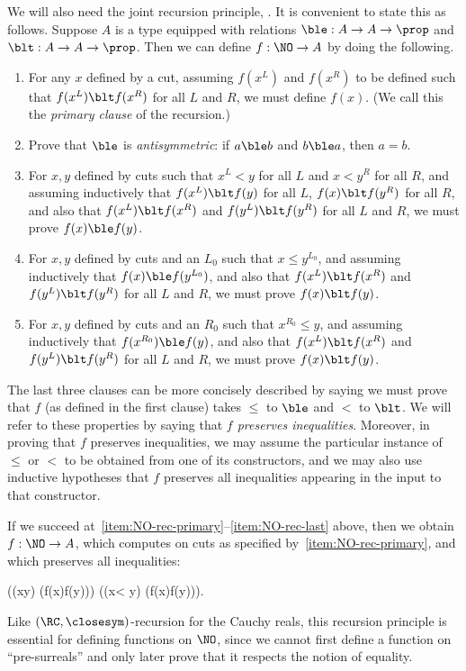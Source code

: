 We will also need the joint recursion principle, .
It is convenient to state this as follows.
Suppose $A$ is a type equipped with relations $\mathord\ble:A\to A\to\prop$ and $\mathord\blt:A\to A\to\prop$.
Then we can define $f:\NO\to A$ by doing the following.
\begin{enumerate}
\item For any $x$ defined by a cut, assuming $f(x^L)$ and $f(x^R)$ to be defined such that $f(x^L)\blt f(x^R)$ for all $L$ and $R$, we must define $f(x)$.  (We call this the \emph{primary clause} of the recursion.)\label{item:NO-rec-primary}
\item Prove that $\ble$ is \emph{antisymmetric}: if $a\ble b$ and $b\ble a$, then $a=b$.
\item For $x,y$ defined by cuts such that $x^L<y$ for all $L$ and $x<y^R$ for all $R$, and assuming inductively that $f(x^L)\blt f(y)$ for all $L$, $f(x)\blt f(y^R)$ for all $R$, and also that $f(x^L)\blt f(x^R)$ and $f(y^L)\blt f(y^R)$ for all $L$ and $R$, we must prove $f(x)\ble f(y)$.
\item For $x,y$ defined by cuts and an $L_0$ such that $x\le y^{L_0}$, and assuming inductively that $f(x)\ble f(y^{L_0})$, and also that $f(x^L)\blt f(x^R)$ and $f(y^L)\blt f(y^R)$ for all $L$ and $R$, we must prove $f(x)\blt f(y)$.
\item For $x,y$ defined by cuts and an $R_0$ such that $x^{R_0}\le y$, and assuming inductively that $f(x^{R_0})\ble f(y)$, and also that $f(x^L)\blt f(x^R)$ and $f(y^L)\blt f(y^R)$ for all $L$ and $R$, we must prove $f(x)\blt f(y)$.\label{item:NO-rec-last}
\end{enumerate}
The last three clauses can be more concisely described by saying we must prove that $f$ (as defined in the first clause) takes $\le$ to $\ble$ and $<$ to $\blt$.
We will refer to these properties by saying that \emph{$f$ preserves inequalities}.
Moreover, in proving that $f$ preserves inequalities, we may assume the particular instance of $\le$ or $<$ to be obtained from one of its constructors, and we may also use inductive hypotheses that $f$ preserves all inequalities appearing in the input to that constructor.

If we succeed at~\ref{item:NO-rec-primary}--\ref{item:NO-rec-last} above, then we obtain $f:\NO\to A$, which computes on cuts as specified by~\ref{item:NO-rec-primary}, and which preserves all inequalities:
%
\begin{narrowmultline*}
  \Big((x\le y) \to (f(x)\ble f(y))\Big) \land
  \narrowbreak
  \Big((x< y) \to (f(x)\blt f(y))\Big).
\end{narrowmultline*}
%
Like $(\RC,\closesym)$-recursion for the Cauchy reals, this recursion principle is essential for defining functions on $\NO$, since we cannot first define a function on ``pre-surreals'' and only later prove that it respects the notion of equality.

